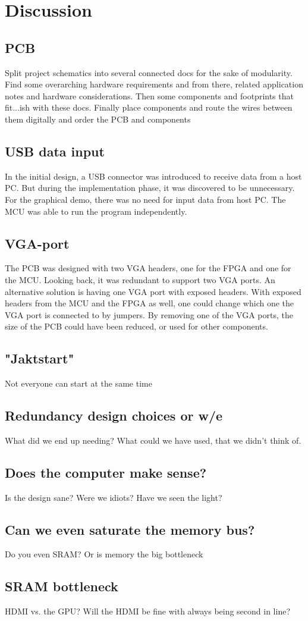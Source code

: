 \documentclass[../main/report.tex]{subfiles}
\begin{document}
\chapter{Discussion}



\section{PCB}
Split project schematics into several connected docs for the sake of modularity. Find some overarching hardware requirements and from there, related application notes and hardware considerations. Then some components and footprints that fit...ish with these docs.
Finally place components and route the wires between them digitally and order the PCB and components


\section{USB data input}
In the initial design, a USB connector was introduced to receive data from a host PC. 
But during the implementation phase, it was discovered to be unnecessary.
For the graphical demo, there was no need for input data from host PC. 
The MCU was able to run the program independently.


\section{VGA-port}
The PCB was designed with two VGA headers, one for the FPGA and one for the MCU. 
Looking back, it was redundant to support two VGA ports.
An alternative solution is having one VGA port with exposed headers.
With exposed headers from the MCU and the FPGA as well, one could change which one the VGA port is connected to by jumpers.
By removing one of the VGA ports, the size of the PCB could have been reduced, or used for other components. 




\section{"Jaktstart"}

Not everyone can start at the same time

\section{Redundancy design choices or w/e}
What did we end up needing?
What could we have used, that we didn't think of.

\section{Does the computer make sense?}
Is the design sane?
Were we idiots?
Have we seen the light?

\section{Can we even saturate the memory bus?}
Do you even SRAM?
Or is memory the big bottleneck

\section{SRAM bottleneck}
HDMI vs. the GPU?
Will the HDMI be fine with always being second in line?
\end{document}
